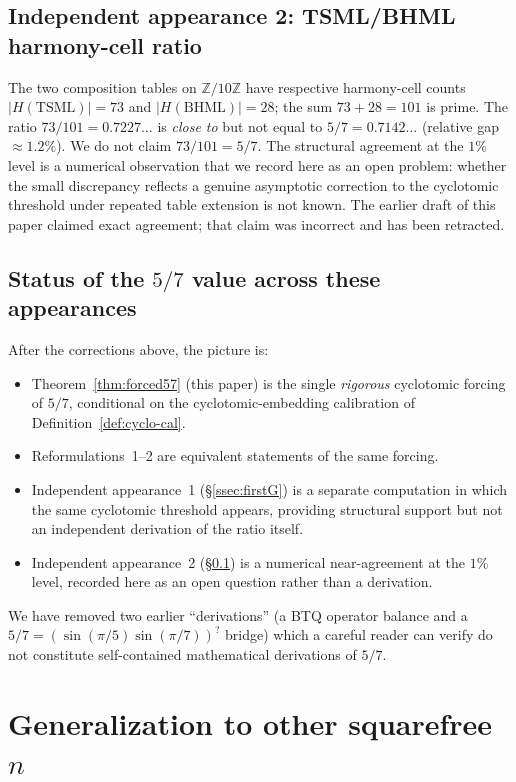 \documentclass[11pt,reqno]{amsart}
\theoremstyle{plain}
\theoremstyle{definition}
\newcommand{\Z}{\mathbb{Z}}
\newcommand{\Zts}{\Z/10\Z}
\begin{document}
\subsection{Independent appearance 2: TSML/BHML harmony-cell ratio} \label{ssec:tsml}

The two composition tables on $\Zts$ have respective harmony-cell counts $|H(\mathrm{TSML})| = 73$ and $|H(\mathrm{BHML})| = 28$; the sum $73 + 28 = 101$ is prime. The ratio $73/101 = 0.7227\ldots$ is \emph{close to} but not equal to $5/7 = 0.7142\ldots$ (relative gap $\approx 1.2\%$). We do not claim $73/101 = 5/7$. The structural agreement at the $1\%$ level is a numerical observation that we record here as an open problem: whether the small discrepancy reflects a genuine asymptotic correction to the cyclotomic threshold under repeated table extension is not known. The earlier draft of this paper claimed exact agreement; that claim was incorrect and has been retracted.

\subsection{Status of the $5/7$ value across these appearances}

After the corrections above, the picture is:
\begin{itemize}
\item Theorem~\ref{thm:forced57} (this paper) is the single \emph{rigorous} cyclotomic forcing of $5/7$, conditional on the cyclotomic-embedding calibration of Definition~\ref{def:cyclo-cal}.
\item Reformulations~1--2 are equivalent statements of the same forcing.
\item Independent appearance~1 (\S\ref{ssec:firstG}) is a separate computation in which the same cyclotomic threshold appears, providing structural support but not an independent derivation of the ratio itself.
\item Independent appearance~2 (\S\ref{ssec:tsml}) is a numerical near-agreement at the $1\%$ level, recorded here as an open question rather than a derivation.
\end{itemize}
We have removed two earlier ``derivations'' (a BTQ operator balance and a $5/7 = (\sin(\pi/5)\sin(\pi/7))^{?}$ bridge) which a careful reader can verify do not constitute self-contained mathematical derivations of $5/7$.

\section{Generalization to other squarefree $n$} \label{sec:gen}
\end{document}
